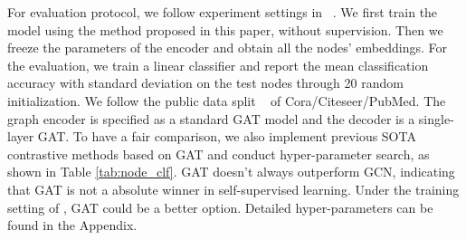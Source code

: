 {For evaluation protocol, we follow experiment settings in ~\cite{velivckovic2018deep,hassani2020contrastive,thakoor2021bootstrapped,zhang2021canonical}. We first train the model using the method proposed in this paper, without supervision. Then we freeze the parameters of the encoder and obtain all the nodes' embeddings. For the evaluation, we train a linear classifier and report the mean classification accuracy with standard deviation on the test nodes through 20 random initialization. We follow the public data split ~\cite{velivckovic2018deep,hassani2020contrastive,zhang2021canonical}  of Cora/Citeseer/PubMed. The graph encoder  is specified as a standard GAT model and the decoder  is a single-layer GAT. To have a fair comparison, we also implement previous SOTA contrastive methods based on GAT and conduct hyper-parameter search, as shown in Table \ref{tab:node_clf}. GAT doesn't always outperform GCN, indicating that GAT is not a absolute winner in self-supervised learning. Under the training setting of \model, GAT could be a better option.
Detailed hyper-parameters can be found in the Appendix.


}
